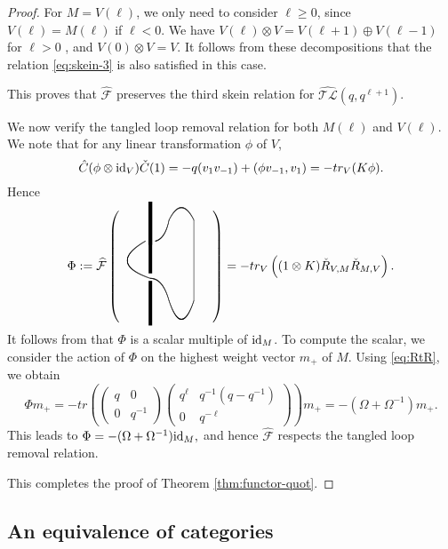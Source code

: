 \documentclass[12pt]{amsart}
\theoremstyle{definition}
\theoremstyle{remark}
\numberwithin{equation}{section}
\newcommand{\CF}{{\mathcal F}}
\newcommand{\id}{{\rm{id}}}
\newcommand{\ATLC}{{\widehat{\mathcal{TL}}}}
\begin{document}
\begin{proof}
For $M=V(\ell)$, we only need to consider $\ell\ge 0$, since $V(\ell)=M(\ell)$ if $\ell<0$.   
We have $V(\ell)\otimes V= V(\ell+1)\oplus V(\ell-1)$ for $\ell>0$ , and $V(0)\otimes V=V$.  
It follows from these decompositions that the relation \eqref{eq:skein-3} is also satisfied in this case. 

This proves that $\widehat\CF$ preserves the third skein relation for $\ATLC(q, q^{\ell+1})$. 


We now verify the tangled loop removal relation for both $M(\ell)$ and $V(\ell)$.  We 
note that for any linear transformation $\phi$ of $V$, 
\[
\hat{C}(\phi\otimes\id_V)\check{C}(1)= -q(v_1 v_{-1}) + (\phi v_{-1}, v_1) = - tr_V(K\phi).
\]
Hence 
\[
\Phi:= \widehat\CF\left(\begin{picture}(75, 50)(-40,45)
{
\linethickness{1mm}
\put(-15, 65){\line(0, 1){35}}
\put(-15, 42){\line(0, 1){58}}
\put(-15, 0){\line(0, 1){36}}
}

\qbezier(-19, 68)(-50, 50)(-15, 38)

\qbezier(-11, 68)(-3, 70)(0, 85)

\qbezier(-15, 38)(-5, 38)(0, 20)

\put(20, 20){\line(0, 1){65}}

\qbezier(0, 20)(10, -10 ) (20, 20)
\qbezier(0, 85)(10, 105) (20, 85)
\end{picture}\right)= - tr_V\left( (1\otimes K)\check{R}_{V, M}\check{R}_{M, V}\right).
\]
It follows from \cite[Proposition 1]{ZGB} that $\Phi$ is a scalar multiple of $\id_M$. 
To compute the scalar, we consider the action of $\Phi$ on the highest weight vector $m_+$ of $M$. Using \eqref{eq:RtR}, we obtain
\[
\Phi m_+= - tr\left( \begin{pmatrix} q & 0\\ 0 & q^{-1}\end{pmatrix} \begin{pmatrix} q^{\ell} & q^{-1}(q-q^{-1})\\ 0 & q^{-\ell}\end{pmatrix}
\right) m_+=-(\Omega+\Omega^{-1})m_+.
\]
This leads to 
$
\Phi= -(\Omega+\Omega^{-1})\id_M,  
$
and hence 
 $\widehat\CF$ respects the tangled loop removal relation. 

This completes the proof of Theorem \ref{thm:functor-quot}. 
\end{proof}






%
%
\subsection{An equivalence of categories}
%
%
\end{document}
